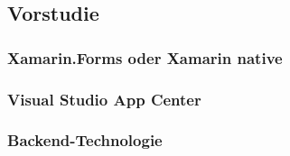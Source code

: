 \subsection{Vorstudie}

\subsubsection{Xamarin.Forms oder Xamarin native}

\subsubsection{Visual Studio App Center}

\subsubsection{Backend-Technologie}